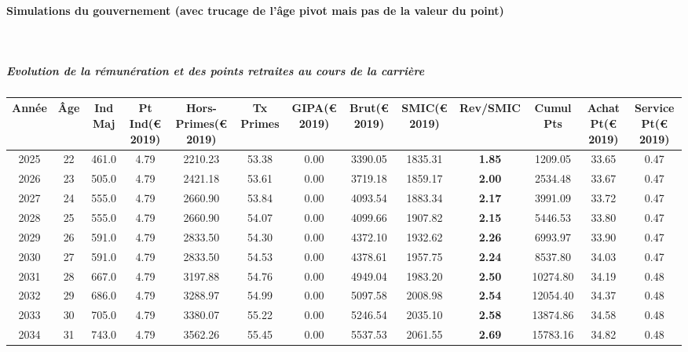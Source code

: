 \newpage 
 
\paragraph{Simulations du gouvernement (avec trucage de l'âge pivot mais pas de la valeur du point)}  ~\\ 
 
\subparagraph{Evolution de la rémunération et des points retraites au cours de la carrière} 
 
{ \scriptsize \begin{center} 
\begin{tabular}[htb]{|c|c||c|c|c|c|c|c||c|c||c|c|c||} 
\hline 
 Année &  Âge &  Ind Maj &  Pt Ind(\euro{} 2019) &   Hors-Primes(\euro{} 2019) &  Tx Primes &  GIPA(\euro{} 2019) &  Brut(\euro{} 2019) &  SMIC(\euro{} 2019) &  Rev/SMIC &  Cumul Pts &  Achat Pt(\euro{} 2019) &  Service Pt(\euro{} 2019) \\ 
\hline \hline 
 2025 &  22 &  461.0 &  4.79 &  2210.23 &  53.38 &  0.00 &  3390.05 &  1835.31 &  {\bf 1.85} &  1209.05 &  33.65 &  0.47 \\ 
\hline 
 2026 &  23 &  505.0 &  4.79 &  2421.18 &  53.61 &  0.00 &  3719.18 &  1859.17 &  {\bf 2.00} &  2534.48 &  33.67 &  0.47 \\ 
\hline 
 2027 &  24 &  555.0 &  4.79 &  2660.90 &  53.84 &  0.00 &  4093.54 &  1883.34 &  {\bf 2.17} &  3991.09 &  33.72 &  0.47 \\ 
\hline 
 2028 &  25 &  555.0 &  4.79 &  2660.90 &  54.07 &  0.00 &  4099.66 &  1907.82 &  {\bf 2.15} &  5446.53 &  33.80 &  0.47 \\ 
\hline 
 2029 &  26 &  591.0 &  4.79 &  2833.50 &  54.30 &  0.00 &  4372.10 &  1932.62 &  {\bf 2.26} &  6993.97 &  33.90 &  0.47 \\ 
\hline 
 2030 &  27 &  591.0 &  4.79 &  2833.50 &  54.53 &  0.00 &  4378.61 &  1957.75 &  {\bf 2.24} &  8537.80 &  34.03 &  0.47 \\ 
\hline 
 2031 &  28 &  667.0 &  4.79 &  3197.88 &  54.76 &  0.00 &  4949.04 &  1983.20 &  {\bf 2.50} &  10274.80 &  34.19 &  0.48 \\ 
\hline 
 2032 &  29 &  686.0 &  4.79 &  3288.97 &  54.99 &  0.00 &  5097.58 &  2008.98 &  {\bf 2.54} &  12054.40 &  34.37 &  0.48 \\ 
\hline 
 2033 &  30 &  705.0 &  4.79 &  3380.07 &  55.22 &  0.00 &  5246.54 &  2035.10 &  {\bf 2.58} &  13874.86 &  34.58 &  0.48 \\ 
\hline 
 2034 &  31 &  743.0 &  4.79 &  3562.26 &  55.45 &  0.00 &  5537.53 &  2061.55 &  {\bf 2.69} &  15783.16 &  34.82 &  0.48 \\ 

\end{tabular}
\end{center}}
